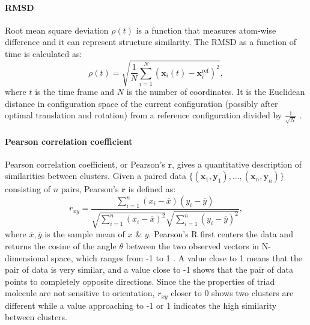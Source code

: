 \documentclass[a4paper]{article}
\begin{document}
\paragraph{RMSD}
Root mean square deviation \( \rho(t) \) is a function that measures atom-wise difference and it can represent structure similarity. The RMSD as a function of time is calculated as:
\begin{equation}
    \rho(t)=\sqrt{\frac{1}{N}\sum_{i=1}^N\left(\bm{x}_i(t)-\bm{x}_i^\text{ref}\right)^2},
    \label{Eq: RMSD}
\end{equation}
\noindent where \(t\) is the time frame and \(N\) is the number of coordinates. It is the Euclidean distance in configuration space of the current configuration (possibly after optimal translation and rotation) from a reference configuration divided by \(\frac{1}{\sqrt{N}}\) \cite{scikit-learn}.

\paragraph{Pearson correlation coefficient}
Pearson correlation coefficient, or Pearson's \( \bm{r}\), gives a quantitative description of similarities between clusters. Given a paired data \(\{(\bm{x}_1, \bm{y}_1), ..., (\bm{x}_n, \bm{y}_n)\}\) consisting of \(n\) pairs, Pearson's \( \bm{r}\) is defined as:
\begin{equation}
    r_{xy} = \frac{\sum_{i=1}^n(x_i-\overline{x})(y_i-\overline{y})}{\sqrt{\sum_{i=1}^n(x_i-\overline{x})^2}\sqrt{\sum_{i=1}^n(y_i-\overline{y})^2}},
    \label{Eq: Pearson R}
\end{equation}
\noindent where \(\overline{x}, \overline{y}\) is the sample mean of \(x\) \& \(y\). Pearson's R first centers the data and returns the cosine of the angle \(\theta\) between the two observed vectors in N-dimensional space, which ranges from -1 to 1 \cite{PearsonR}. A value close to 1 means that the pair of data is very similar, and a value close to -1 shows that the pair of data points to completely opposite directions. Since the the properties of triad molecule are not sensitive to orientation, \(r_{xy}\) closer to 0 shows two clusters are different while a value approaching to -1 or 1 indicates the high similarity between clusters. 
\end{document}
